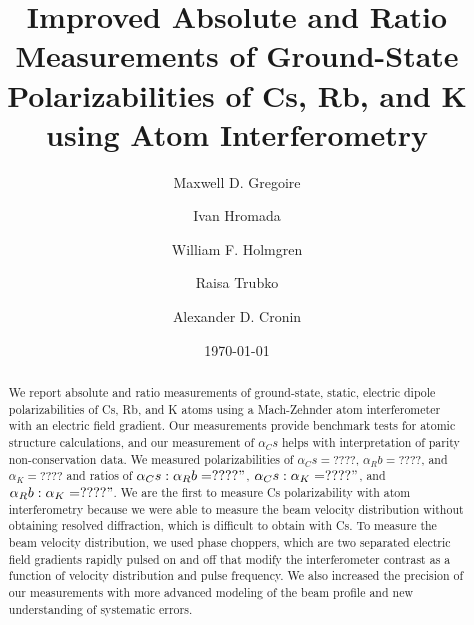\documentclass[twocolumn, prl,showpacs,superscriptaddress]{revtex4-1}   %
\begin{document}
\title{Improved Absolute and Ratio Measurements of Ground-State Polarizabilities of Cs, Rb, and K using Atom Interferometry}

\author{Maxwell D. Gregoire}
\author{Ivan Hromada}
\author{William F. Holmgren}
\author{Raisa Trubko}
\author{Alexander D. Cronin}

\date{\today}





\begin{abstract}
We report absolute and ratio measurements of ground-state, static, electric dipole polarizabilities of Cs, Rb, and K atoms using a Mach-Zehnder atom interferometer with an electric field gradient. Our measurements provide benchmark tests for atomic structure calculations, and our measurement of $\alpha_Cs$ helps with interpretation of parity non-conservation data. We measured polarizabilities of $\alpha_Cs = ????$, $\alpha_Rb = ????$, and $\alpha_K = ????$ and ratios of $\alpha_Cs:\alpha_Rb = ????"$, $\alpha_Cs:\alpha_K = ????"$, and $\alpha_Rb:\alpha_K = ????"$. We are the first to measure Cs polarizability with atom interferometry because we were able to measure the beam velocity distribution without obtaining resolved diffraction, which is difficult to obtain with Cs. To measure the beam velocity distribution, we used phase choppers, which are two separated electric field gradients rapidly pulsed on and off that modify the interferometer contrast as a function of velocity distribution and pulse frequency. We also increased the precision of our measurements with more advanced modeling of the beam profile and new understanding of systematic errors.
\end{abstract}





\maketitle
\end{document}
